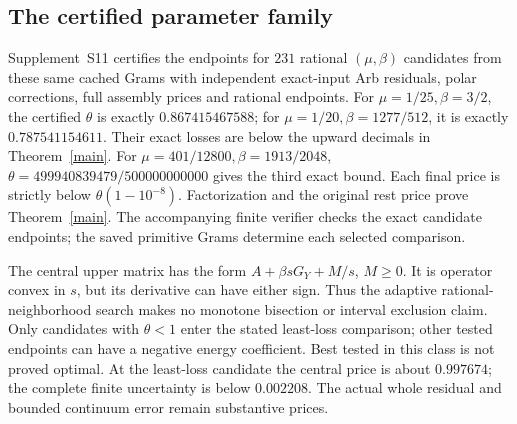 \documentclass[12pt]{article}
\theoremstyle{remark}\newtheorem{remark}[theorem]{Remark}
\begin{document}
\subsection{The certified parameter family}
Supplement~S11 certifies the endpoints for $231$ rational $(\mu,\beta)$ candidates from
these same cached Grams with independent exact-input Arb residuals,
polar corrections, full assembly prices and rational endpoints.
For $\mu=1/25,\beta=3/2$, the certified $\theta$ is exactly
$0.867415467588$; for $\mu=1/20,\beta=1277/512$, it is exactly
$0.787541154611$. Their exact losses are below the upward decimals in
Theorem~\ref{main}. For $\mu=401/12800,\beta=1913/2048$,
$\theta=499940839479/500000000000$ gives the third exact bound.
Each final price is strictly below $\theta(1-10^{-8})$.
Factorization and the original rest price prove Theorem~\ref{main}.
The accompanying finite verifier checks the exact candidate endpoints;
the saved primitive Grams determine each selected comparison.

The central upper matrix has the form $A+\beta sG_Y+M/s$, $M\ge0$.
It is operator convex in $s$, but its derivative can have either sign.
Thus the adaptive rational-neighborhood search makes no monotone
bisection or interval exclusion claim. Only candidates with $\theta<1$ enter the stated least-loss comparison;
other tested endpoints can have a negative energy coefficient. Best tested
in this class is not proved optimal.
At the least-loss candidate the central price is about $0.997674$;
the complete finite uncertainty is below $0.002208$. The actual whole
residual and bounded continuum error remain substantive prices.
\end{document}
